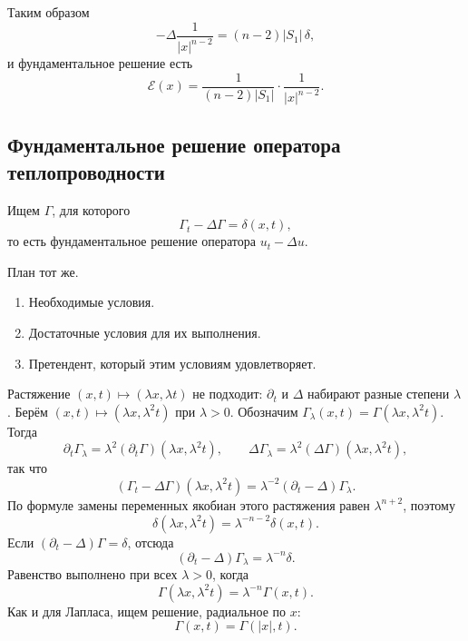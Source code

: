 \documentclass[12pt,a4paper]{article}
\begin{document}
Таким образом
\[
-\Delta\frac{1}{|x|^{n-2}}
=
(n-2)|S_1|\,\delta,
\]
и фундаментальное решение есть
\[
\mathcal{E}(x)
=
\frac{1}{(n-2)|S_1|}
\cdot
\frac{1}{|x|^{n-2}}.
\]





\subsection{Фундаментальное решение оператора теплопроводности}

Ищем \(\Gamma\), для которого
\[
\Gamma_t-\Delta\Gamma=\delta(x,t),
\]
то есть фундаментальное решение оператора \(u_t-\Delta u\).

План тот же.
\begin{enumerate}
\item Необходимые условия.
\item Достаточные условия для их выполнения.
\item Претендент, который этим условиям удовлетворяет.
\end{enumerate}

Растяжение \((x,t)\mapsto(\lambda x,\lambda t)\) не подходит:
\(\partial_t\) и \(\Delta\) набирают разные степени \(\lambda\).
Берём \((x,t)\mapsto(\lambda x,\lambda^2 t)\) при \(\lambda>0\).
Обозначим \(\Gamma_\lambda(x,t)=\Gamma(\lambda x,\lambda^2 t)\). Тогда
\[
\partial_t\Gamma_\lambda
=
\lambda^2(\partial_t\Gamma)(\lambda x,\lambda^2 t),
\qquad
\Delta\Gamma_\lambda
=
\lambda^2(\Delta\Gamma)(\lambda x,\lambda^2 t),
\]
так что
\[
(\Gamma_t-\Delta\Gamma)(\lambda x,\lambda^2 t)
=
\lambda^{-2}(\partial_t-\Delta)\Gamma_\lambda.
\]
По формуле замены переменных якобиан этого растяжения равен \(\lambda^{n+2}\), поэтому
\[
\delta(\lambda x,\lambda^2 t)
=
\lambda^{-n-2}\delta(x,t).
\]
Если \((\partial_t-\Delta)\Gamma=\delta\), отсюда
\[
(\partial_t-\Delta)\Gamma_\lambda
=
\lambda^{-n}\delta.
\]
Равенство выполнено при всех \(\lambda>0\), когда
\[
\Gamma(\lambda x,\lambda^2 t)
=
\lambda^{-n}\Gamma(x,t).
\]
Как и для Лапласа, ищем решение, радиальное по \(x\):
\[
\Gamma(x,t)=\Gamma(|x|,t).
\]
\end{document}
